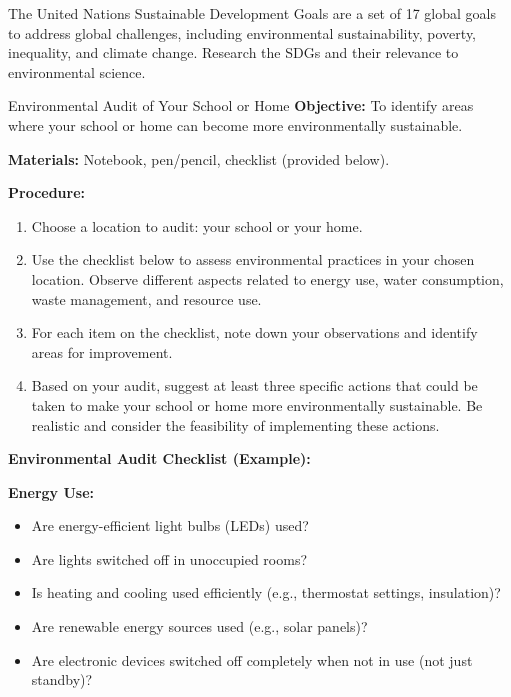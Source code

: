 \begin{marginnote}
 The United Nations Sustainable Development Goals are a set of 17 global goals to address global challenges, including environmental sustainability, poverty, inequality, and climate change.  Research the SDGs and their relevance to environmental science. 
\end{marginnote}

\begin{investigation}{Environmental Audit of Your School or Home}
\textbf{Objective:} To identify areas where your school or home can become more environmentally sustainable.

\textbf{Materials:} Notebook, pen/pencil, checklist (provided below).

\textbf{Procedure:}
\begin{enumerate}
    \item Choose a location to audit: your school or your home.
    \item Use the checklist below to assess environmental practices in your chosen location.  Observe different aspects related to energy use, water consumption, waste management, and resource use.
    \item For each item on the checklist, note down your observations and identify areas for improvement.
    \item Based on your audit, suggest at least three specific actions that could be taken to make your school or home more environmentally sustainable.  Be realistic and consider the feasibility of implementing these actions.
\end{enumerate}

\textbf{Environmental Audit Checklist (Example):}

\textbf{Energy Use:}
\begin{itemize}
    \item Are energy-efficient light bulbs (LEDs) used?
    \item Are lights switched off in unoccupied rooms?
    \item Is heating and cooling used efficiently (e.g., thermostat settings, insulation)?
    \item Are renewable energy sources used (e.g., solar panels)?
    \item Are electronic devices switched off completely when not in use (not just standby)?
\end{itemize}


\end{investigation}
